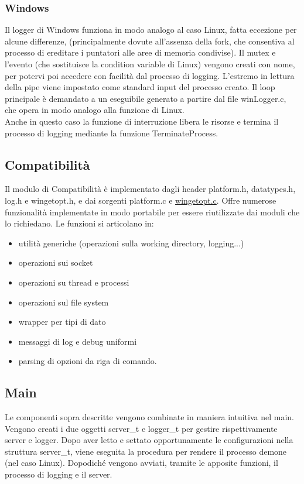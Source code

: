 \documentclass{article}
\begin{document}
\subsubsection{Windows}
Il logger di Windows funziona in modo analogo al caso Linux, fatta eccezione per alcune differenze,
(principalmente dovute all'assenza della fork, che consentiva al processo di ereditare i puntatori alle
aree di memoria condivise).
Il mutex e l'evento (che sostituisce la condition variable di Linux) vengono creati con nome, per
potervi poi accedere con facilità dal processo di logging. L'estremo in lettura della pipe viene 
impostato come standard input del processo creato. Il loop principale è demandato a un eseguibile
generato a partire dal file winLogger.c, che opera in modo analogo alla funzione di Linux.\\
Anche in questo caso la funzione di interruzione libera le risorse e termina il processo di logging
mediante la funzione TerminateProcess.

\subsection{Compatibilità}
Il modulo di Compatibilità è implementato dagli header platform.h, datatypes.h, log.h e wingetopt.h, e dai 
sorgenti platform.c e \href{http://note.sonots.com/Comp/CompLang/cpp/getopt.html}{wingetopt.c}.
Offre numerose funzionalità implementate in modo portabile per essere riutilizzate
dai moduli che lo richiedano. Le funzioni si articolano in:
\begin{itemize}
    \item utilità generiche (operazioni sulla working directory, logging...)
    \item operazioni sui socket
    \item operazioni su thread e processi
    \item operazioni sul file system
    \item wrapper per tipi di dato
    \item messaggi di log e debug uniformi
    \item parsing di opzioni da riga di comando.
\end{itemize} 

\subsection{Main}
Le componenti sopra descritte vengono combinate in maniera intuitiva nel main.
Vengono creati i due oggetti server\_t e logger\_t per gestire rispettivamente server e logger.
Dopo aver letto e settato opportunamente le configurazioni nella struttura server\_t, viene eseguita la 
procedura per rendere il processo demone (nel caso Linux). Dopodiché vengono avviati, tramite le apposite 
funzioni, il processo di logging e il server.
\end{document}
